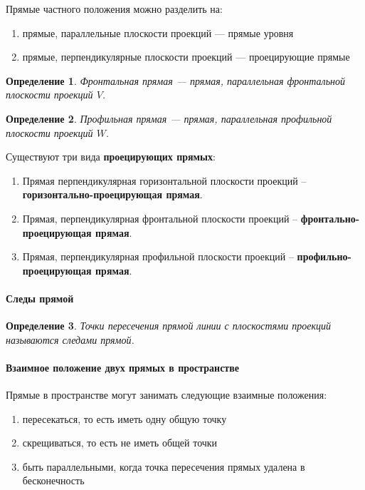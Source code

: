 \documentclass{article}
\newtheorem{definition}{Определение}
\begin{document}
\begin{flushleft}
Прямые частного положения можно разделить на:

\begin{enumerate}
    \item прямые, параллельные плоскости проекций — прямые уровня
    \item прямые, перпендикулярные плоскости проекций — проецирующие прямые
\end{enumerate}

\begin{definition}
    Фронтальная прямая — прямая, параллельная фронтальной плоскости проекций $V$.
\end{definition}

\begin{definition}
    Профильная прямая — прямая, параллельная профильной плоскости проекций $W$.
\end{definition}

Существуют три вида \textbf{проецирующих прямых}:

\begin{enumerate}
    \item Прямая перпендикулярная горизонтальной плоскости проекций – \textbf{горизонтально-проецирующая прямая}.
    \item Прямая, перпендикулярная фронтальной плоскости проекций – \textbf{фронтально-проецирующая прямая}.
    \item Прямая, перпендикулярная профильной плоскости проекций – \textbf{профильно-проецирующая прямая}.
\end{enumerate}

\paragraph{Следы прямой}

\begin{definition}
    Точки пересечения прямой линии с плоскостями проекций называются следами прямой.
\end{definition}

\paragraph{Взаимное положение двух прямых в пространстве}

Прямые в пространстве могут занимать следующие взаимные положения:

\begin{enumerate}
    \item пересекаться, то есть иметь одну общую точку
    \item скрещиваться, то есть не иметь общей точки
    \item быть параллельными, когда точка пересечения прямых удалена в бесконечность
\end{enumerate}


\end{flushleft}
\end{document}
